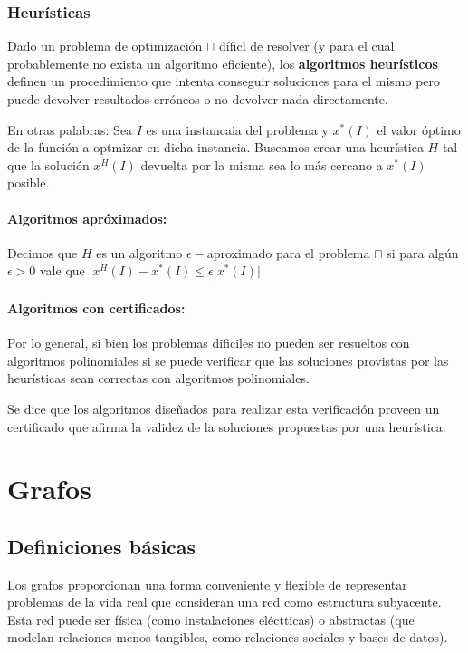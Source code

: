 \subsubsection{Heurísticas}
Dado un problema de optimización \(\sqcap\) díficl de resolver (y para el cual probablemente no exista un algoritmo eficiente), los \textbf{algoritmos heurísticos} definen un procedimiento que intenta conseguir soluciones para el mismo pero puede devolver resultados erróneos o no devolver nada directamente.

En otras palabras: Sea \(I\) es una instancaia del problema y \(x^*(I)\) el valor óptimo de la función a optmizar en dicha instancia. Buscamos crear una heurística \(H\) tal que la solución \(x^H(I)\) devuelta por la misma sea lo más cercano a \(x^*(I)\) posible.

\paragraph{Algoritmos apróximados:} Decimos que \(H\) es un algoritmo \(\epsilon-\)aproximado para el problema \(\sqcap\) si para algún \(\epsilon > 0\) vale que \(|x^H(I) - x^*(I)\leq\epsilon|x^*(I)|\)

\paragraph{Algoritmos con certificados:} Por lo general, si bien los problemas dificiles no pueden ser resueltos con algoritmos polinomiales si se puede verificar que las soluciones provistas por las heurísticas sean correctas con algoritmos polinomiales. 

Se dice que los algoritmos diseñados para realizar esta verificación proveen un certificado que afirma la validez de la soluciones propuestas por una heurística.

\printbibliography[keyword=intro,title={Bibliografía}]

\newpage
\section{Grafos}
\subsection{Definiciones básicas}
Los grafos proporcionan una forma conveniente y flexible de representar problemas de la vida real que consideran una red como estructura subyacente. Esta red puede ser física (como instalaciones eléctticas) o abstractas (que modelan relaciones menos tangibles, como relaciones sociales y bases de datos).

